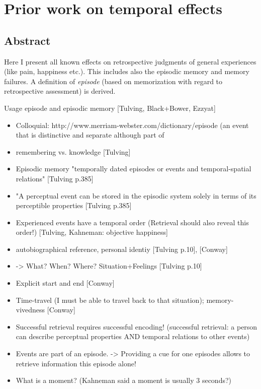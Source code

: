 \chapter{Prior work on temporal effects}\label{chap:03}
\section*{Abstract}
Here I present all known effects on retrospective judgments of general experiences (like pain, happiness etc.).
This includes also the episodic memory and memory failures.
A definition of \emph{episode} (based on memorization with regard to retrospective assessment) is derived.

Usage episode and episodic memory [Tulving, Black+Bower, Ezzyat]
\begin{itemize}
\item Colloquial:  http://www.merriam-webster.com/dictionary/episode (an event that is distinctive and separate although part of \item remembering vs. knowledge [Tulving]

\item Episodic memory "temporally dated episodes or events and temporal-spatial relations" [Tulving p.385]
\item "A perceptual event can be stored in the episodic system solely in terms of its perceptible properties [Tulving p.385]
\item Experienced events have a temporal order (Retrieval should also reveal this order!) [Tulving, Kahneman: objective happiness]

\item autobiographical reference, personal identiy [Tulving p.10], [Conway]
\item -> What? When? Where? Situation+Feelings [Tulving p.10]
\item Explicit start and end [Conway]
\item Time-travel (I must be able to travel back to that situation); memory-vivedness [Conway]
      
\item Successful retrieval requires successful encoding! (successful retrieval: a person can describe perceptual properties AND temporal relations to other events)

\item Events are part of an episode. -> Providing a cue for one episodes allows to retrieve information this episode alone!
\item What is a moment? (Kahneman said a moment is usually 3 seconds?)
\end{itemize}

